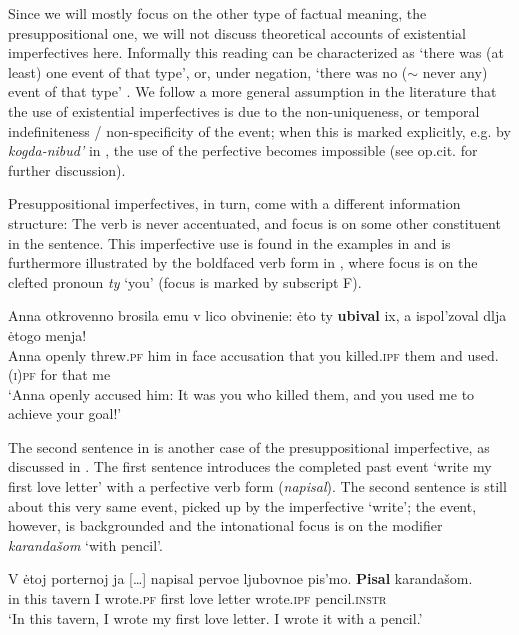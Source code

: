 \documentclass[output=paper,
modfonts,
newtxmath,
hidelinks
]{langscibook}
\begin{document}
\noindent Since we will mostly focus on the other type of factual meaning, the presuppositional one, we will not discuss theoretical accounts of existential imperfectives here. Informally this reading can be characterized as `there was (at least) one event of that type', or, under negation, `there was no ($\sim$ never any) event of that type' \citep[see][]{mehlig01, mehlig13, muellerkrat, muellerPI, gehrkemueller}. We follow a more general assumption in the literature that the use of existential imperfectives is due to the non-uniqueness, or temporal indefiniteness / non-specificity of the event; when this is marked explicitly, e.g. by \textit{kogda-nibud'} in , the use of the perfective becomes impossible (see op.cit. for further discussion). 

Presuppositional imperfectives, in turn, come with a different information structure: The verb is never accentuated, and  focus is on some other constituent in the sentence. This imperfective use is found in the examples in  and is furthermore illustrated by the boldfaced verb form in , where focus is on the clefted pronoun \textit{ty} `you' (focus is marked by subscript F).

\ea\gll	Anna otkrovenno brosila emu v lico obvinenie: \.{e}to ty \textbf{ubival} ix, a ispol'zoval dlja \.{e}togo menja!\\ 						
	Anna openly threw.\textsc{pf} him in face accusation that you killed.\textsc{ipf} them and used.\textsc{(i)pf} for that me\\
\glt	`Anna openly accused him: It was you who killed them, and you used me to achieve your goal!' \hfill \citep[after][131]{gronndiss}\label{Anna}
\z

\noindent The second sentence in  \citep[attributed to][]{forsyth70} is another case of the presuppositional imperfective, as discussed in \citet[][192f.]{gronndiss}. The first sentence introduces the completed past event `write my first love letter' with a perfective verb form (\textit{napisal}). The second sentence is still about this very same event, picked up by the imperfective `write'; the event, however, is backgrounded and the intonational focus is on the modifier \textit{karandašom} `with pencil'.

\ea\label{love letter} \gll V \.{e}toj porternoj ja [\dots] napisal pervoe ljubovnoe pis'mo. \textbf{Pisal} karandašom.\\
in this tavern I {} wrote.\textsc{pf} first love letter 			 wrote.\textsc{ipf} pencil.\textsc{instr}\\
\glt `In this tavern, I wrote my first love letter. I wrote it with a pencil.'
\z
\end{document}
